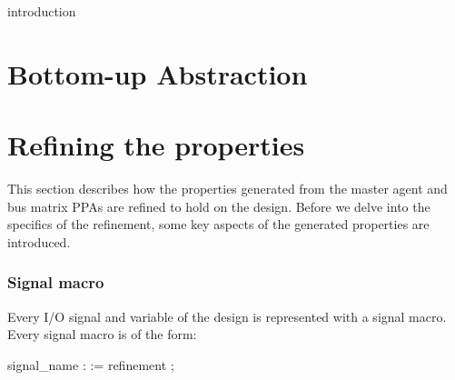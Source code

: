 \label{ch:design}

introduction



\section{Bottom-up Abstraction}



\section{Refining the properties}
This section describes how the properties generated from the master agent and bus matrix PPAs are refined to hold on the design. Before we delve into the specifics of the refinement, some key aspects of the generated properties are introduced. \par

\subsubsection{Signal macro}
Every I/O signal and variable of the design is represented with a signal macro. Every signal macro is of the form: \par
{} signal\_name :  := refinement ; \par

